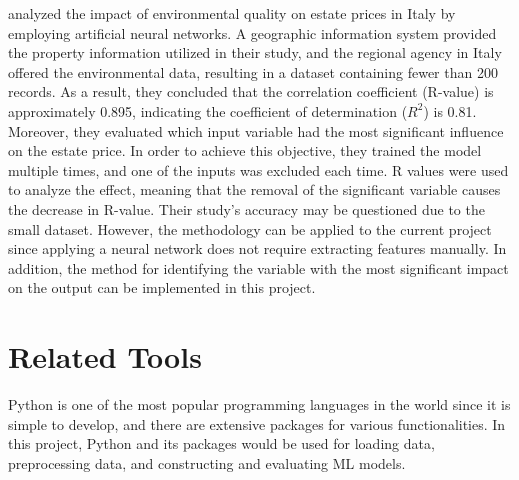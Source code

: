 \documentclass[12pt,twoside]{report}
\begin{document}
\citet{RN37} analyzed the impact of environmental quality on estate prices in Italy by employing artificial neural networks. A geographic information system provided the property information utilized in their study, and the regional agency in Italy offered the environmental data, resulting in a dataset containing fewer than 200 records. As a result, they concluded that the correlation coefficient (R-value) is approximately 0.895, indicating the coefficient of determination ($R^2$) is 0.81. Moreover, they evaluated which input variable had the most significant influence on the estate price. In order to achieve this objective, they trained the model multiple times, and one of the inputs was excluded each time. R values were used to analyze the effect, meaning that the removal of the significant variable causes the decrease in R-value. Their study's accuracy may be questioned due to the small dataset. However, the methodology can be applied to the current project since applying a neural network does not require extracting features manually. In addition, the method for identifying the variable with the most significant impact on the output can be implemented in this project.

\section{Related Tools}
Python is one of the most popular programming languages in the world since it is simple to develop, and there are extensive packages for various functionalities. In this project, Python and its packages would be used for loading data, preprocessing data, and constructing and evaluating ML models. 

\end{document}

